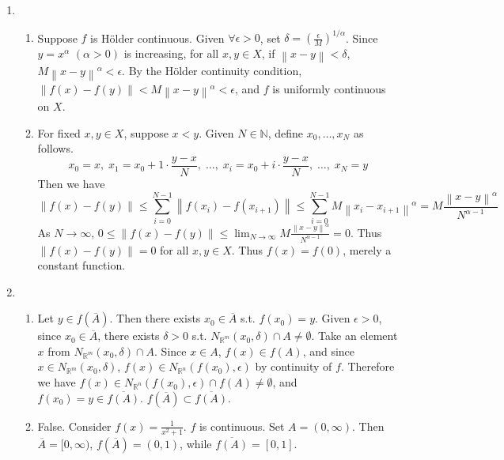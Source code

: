 \documentclass[11pt]{report}
\newcommand{\norm}[1]{\left\lVert#1\right\rVert}
\newcommand{\ra}{\rightarrow}
\newcommand{\ds}{\displaystyle}
\newcommand{\R}{\mathbb{R}}
\newcommand{\N}{\mathbb{N}}
\begin{document}
\begin{enumerate}
\item 
\begin{enumerate}
	\item Suppose $f$ is Hölder continuous. Given $\forall \epsilon > 0$, set $\delta = \left(\frac{\epsilon}{M}\right)^{1/\alpha}$. Since $y = x^\alpha$ $(\alpha > 0)$ is increasing, for all $x, y\in X$, if $\norm{x - y} < \delta$, $M\norm{x - y}^\alpha < \epsilon$. By the Hölder continuity condition, $\norm{f(x) - f(y)} < M\norm{x - y}^\alpha <\epsilon$, and $f$ is uniformly continuous on $X$.
	\item For fixed $x, y\in X$, suppose $x < y$. Given $N\in \N$, define $x_0, \dots, x_N$ as follows. $$x_0 = x,\; x_1 = x_0 +1\cdot \frac{y-x}{N},\; \dots, \;x_i = x_0 + i\cdot \frac{y-x}{N},\; \dots,\; x_N = y$$
	Then we have
	$$\norm{f(x) - f(y)} \leq \sum_{i=0}^{N-1}\norm{f(x_i) - f(x_{i+1})} \leq \sum_{i=0}^{N-1} M\norm{x_i - x_{i+1}}^\alpha = M  \frac{\norm{x- y}^\alpha}{N^{\alpha-1}}$$
	As $N\ra \infty$, $0 \leq \norm{f(x)- f(y)} \ds\leq \lim_{N\ra\infty}  M  \frac{\norm{x- y}^\alpha}{N^{\alpha-1}} = 0$. Thus $\norm{f(x) - f(y)} = 0$ for all $x, y\in X$. Thus $f(x) = f(0)$, merely a constant function.
\end{enumerate}

\item 
\begin{enumerate}
	\item Let $y\in f(\overline{A})$. Then there exists $x_0\in \overline{A}$ s.t. $f(x_0) = y$. Given $\epsilon > 0$, since $x_0\in \overline{A}$, there exists $\delta > 0$ s.t. $N_{\R^m}(x_0, \delta)\cap A \neq \emptyset$. Take an element $x$ from $N_{\R^m}(x_0, \delta) \cap A$. Since $x\in A $, $f(x) \in f(A)$, and since $x\in N_{\R^m}(x_0, \delta) $, $ f(x) \in N_{\R^n}(f(x_0), \epsilon)$ by continuity of $f$. Therefore we have $f(x) \in N_{\R^n}(f(x_0), \epsilon) \cap f(A) \neq \emptyset$, and $f(x_0) = y\in \overline{f(A)}$. $f(\overline{A}) \subset \overline{f(A)}$.
	\item False. Consider $f(x) = \frac{1}{x^2+1}$. $f$ is continuous. Set $A = (0, \infty)$. Then $\overline{A} = [0, \infty)$, $f(\overline{A}) = (0, 1)$, while $\overline{f(A)} = [0, 1]$.
\end{enumerate}


\end{enumerate}
\end{document}
